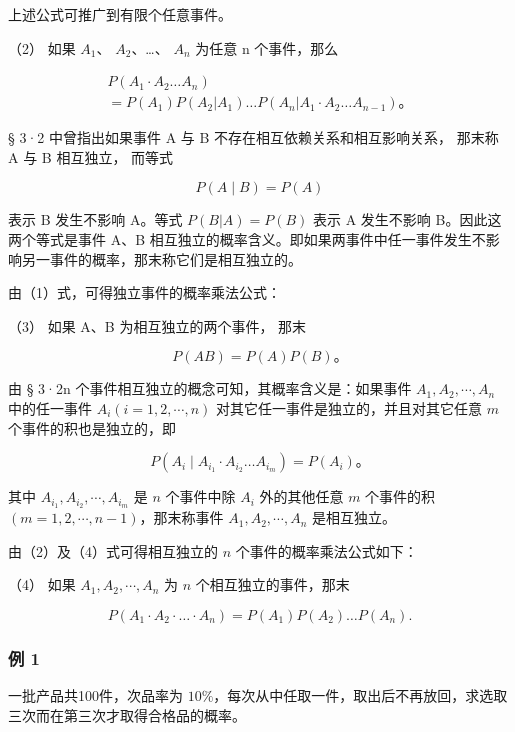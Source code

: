 上述公式可推广到有限个任意事件。

（2） 如果 \(A_{1}\)、 \(A_{2}\)、\ldots、 \(A_{n}\) 为任意 n
个事件，那么

\[
\boxed { \begin{array}{l} P (A _ {1} \cdot A _ {2} \dots A _ {n}) \\ = P (A _ {1}) P (A _ {2} | A _ {1}) \dots P (A _ {n} | A _ {1} \cdot A _ {2} \dots A _ {n - 1})\text{。} \end{array} } \tag {2}
\]

§ 3·2 中曾指出如果事件 A 与 B 不存在相互依赖关系和相互影响关系， 那末称
A 与 B 相互独立， 而等式

\[
P (A \mid B) = P (A)
\]

表示 B 发生不影响 A。等式 \(P(B|A)=P(B)\) 表示 A 发生不影响
B。因此这两个等式是事件 A、B
相互独立的概率含义。即如果两事件中任一事件发生不影响另一事件的概率，那末称它们是相互独立的。

由（1）式，可得独立事件的概率乘法公式：

（3） 如果 A、B 为相互独立的两个事件， 那末

\[
P (A B) = P (A) P (B)\text{。} \tag {3}
\]

由 § 3·2n 个事件相互独立的概念可知，其概率含义是：如果事件
\(A_{1}, A_{2}, \cdots, A_{n}\) 中的任一事件
\(A_{i} (i = 1, 2, \cdots, n)\) 对其它任一事件是独立的，并且对其它任意
\(m\) 个事件的积也是独立的，即

\[
P \left(A _ {i} \mid A _ {i _ {1}} \cdot A _ {i _ {2}} \dots A _ {i _ {m}}\right) = P \left(A _ {i}\right)\text{。} \tag {4}
\]

其中 \(A_{i_1}, A_{i_2}, \cdots, A_{i_m}\) 是 \(n\) 个事件中除 \(A_i\)
外的其他任意 \(m\) 个事件的积 \((m = 1, 2, \cdots, n - 1)\)，那末称事件
\(A_1, A_2, \cdots, A_n\) 是相互独立。

由（2）及（4）式可得相互独立的 \(n\) 个事件的概率乘法公式如下：

（4） 如果 \(A_{1}, A_{2}, \cdots, A_{n}\) 为 \(n\)
个相互独立的事件，那末

\[
\boxed {P (A _ {1} \cdot A _ {2} \cdot \dots \cdot A _ {n}) = P (A _ {1}) P (A _ {2}) \dots P (A _ {n}).} \tag {5}
\]

\subsubsection{例 1}

一批产品共100件，次品率为
\(10\%\)，每次从中任取一件，取出后不再放回，求选取三次而在第三次才取得合格品的概率。

